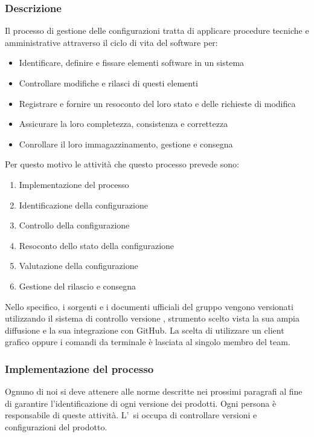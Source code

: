 		\subsubsection{Descrizione}	\label{Descrizione}
		Il processo di gestione delle configurazioni tratta di applicare procedure tecniche e amministrative attraverso il ciclo di vita del software per:
		\begin{itemize}
			\item Identificare, definire e fissare elementi software in un sistema
			\item Controllare modifiche e rilasci di questi elementi
			\item Registrare e fornire un resoconto del loro stato e delle richieste di modifica
			\item Assicurare la loro completezza, consistenza e correttezza
			\item Conrollare il loro immagazzinamento, gestione e consegna
		\end{itemize}
		Per questo motivo le attività che questo processo prevede sono:
		\begin{enumerate}
			\item Implementazione del processo
			\item Identificazione della configurazione
			\item Controllo della configurazione
			\item Resoconto dello stato della configurazione
			\item Valutazione della configurazione
			\item Gestione del rilascio e consegna
		\end{enumerate}
		Nello specifico, i sorgenti e i documenti ufficiali del gruppo vengono versionati utilizzando il sistema di controllo versione , strumento scelto vista la sua ampia diffusione e la sua integrazione con GitHub.
		La scelta di utilizzare un client grafico oppure i comandi da terminale è lasciata al singolo membro del team.

		\subsubsection{Implementazione del processo}	\label{ImplementazioneProcesso}
		Ognuno di noi si deve attenere alle norme descritte nei prossimi paragrafi al fine di garantire l'identificazione di ogni versione dei prodotti.
		Ogni persona è responsabile di queste attività.
		L'\Amm\ si occupa di controllare versioni e configurazioni del prodotto.


